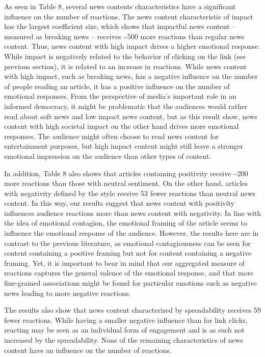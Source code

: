 \documentclass[
]{article}
\begin{document}
\noindent As seen in Table 8, several news contents characteristics have
a significant influence on the number of reactions. The news content
characteristic of impact has the largest coefficient size, which shows
that impactful news content -- measured as breaking news -- receives
\textasciitilde500 more reactions than regular news content. Thus, news
content with high impact drives a higher emotional response. While
impact is negatively related to the behavior of clicking on the link
(see previous section), it is related to an increase in reactions. While
news content with high impact, such as breaking news, has a negative
influence on the number of people reading an article, it has a positive
influence on the number of emotional responses. From the perspective of
media's important role in an informed democracy, it might be problematic
that the audiences would rather read about soft news and low impact news
content, but as this result show, news content with high societal impact
on the other hand drives more emotional responses. The audience might
often choose to read news content for entertainment purposes, but high
impact content might still leave a stronger emotional impression on the
audience than other types of content.

In addition, Table 8 also shows that articles containing positivity
receive \textasciitilde200 more reactions than those with neutral
sentiment. On the other hand, articles with negativity defined by the
style receive 53 fewer reactions than neutral news content. In this way,
our results suggest that news content with positivity influences
audience reactions more than news content with negativity. In line with
the idea of emotional contagion, the emotional framing of the article
seems to influence the emotional response of the audience. However, the
results here are in contrast to the previous literature, as emotional
contagiousness can be seen for content containing a positive framing but
not for content containing a negative framing. Yet, it is important to
bear in mind that our aggregated measure of reactions captures the
general valence of the emotional response, and that more fine-grained
associations might be found for particular emotions such as negative
news leading to more negative reactions.

The results also show that news content characterized by spreadability
receives 59 fewer reactions. While having a smaller negative influence
than for link clicks, reacting may be seen as an individual form of
engagement and is as such not increased by the spreadability. None of
the remaining characteristics of news content have an influence on the
number of reactions.
\end{document}
